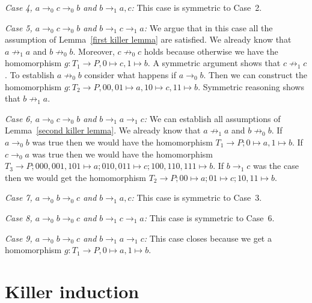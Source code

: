 \documentclass[a4paper]{article}
\newcommand{\case}[2]{\vspace{1ex}\noindent\textit{Case #1, #2:}}
\begin{document}
\case{4}{$a \rightarrow_0 c \rightarrow_0 b$ and $b \rightarrow_1 a,c$}
This case is symmetric to Case~2.

\case{5}{$a \rightarrow_0 c \rightarrow_0 b$ and $b \rightarrow_1 c
\rightarrow_1 a$}
We argue that in this case all the assumption of Lemma~\ref{first killer
lemma} are satisfied. We already know that $a \not \rightarrow_1 a$ and
$b \not \rightarrow_0 b$. Moreover, $c \not \rightarrow_0 c$ holds
because otherwise we have the homomorphism $g : T_1 \to P, 0 \mapsto c,
1 \mapsto b$. A symmetric argument shows that $c \not \rightarrow_1 c$.
To establish $a \not \rightarrow_0 b$ consider what happens if $a
\rightarrow_0 b$. Then we can construct the homomorphism $g : T_2 \to P,
00, 01 \mapsto a, 10 \mapsto c, 11 \mapsto b$. Symmetric reasoning shows
that $b \not \rightarrow_1 a$.

\case{6}{$a \rightarrow_0 c \rightarrow_0 b$ and $b \rightarrow_1 a
\rightarrow_1 c$}
We can establish all assumptions of Lemma~\ref{second killer lemma}. We
already know that $a \not \rightarrow_1 a$ and $b \not \rightarrow_0 b$.
If $a \rightarrow_0 b$ was true then we would have the homomorphism $T_1
\to P; 0 \mapsto a, 1 \mapsto b$. If $c \rightarrow_0 a$ was true then
we would have the homomorphism $T_3 \to P; 000,001,101 \mapsto a;
010,011 \mapsto c; 100,110,111 \mapsto b$. If $b \rightarrow_1 c$ was
the case then we would get the homomorphism $T_2 \to P; 00 \mapsto a; 01
\mapsto c; 10,11 \mapsto b$.


\case{7}{$a \rightarrow_0 b \rightarrow_0 c$ and $b \rightarrow_1 a,c$}
This case is symmetric to Case~3.

\case{8}{$a \rightarrow_0 b \rightarrow_0 c$ and $b \rightarrow_1 c
\rightarrow_1 a$}
This case is symmetric to Case~6.

\case{9}{$a \rightarrow_0 b \rightarrow_0 c$ and $b \rightarrow_1 a
\rightarrow_1 c$} This case closes because we get a homomorphism $g :
T_1 \to P, 0 \mapsto a, 1 \mapsto b$.

\section{Killer induction}
\end{document}

